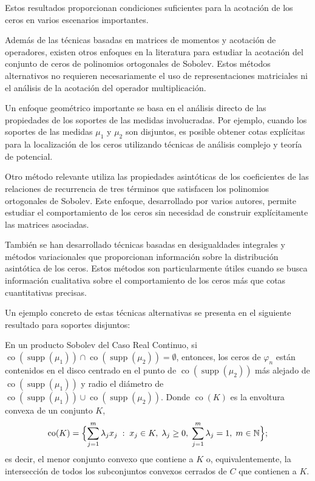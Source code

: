 Estos resultados proporcionan condiciones suficientes para la acotación de los ceros en varios escenarios importantes.

Además de las técnicas basadas en matrices de momentos y acotación de operadores, existen otros enfoques en la literatura para estudiar la acotación del conjunto de ceros de polinomios ortogonales de Sobolev. Estos métodos alternativos no requieren necesariamente el uso de representaciones matriciales ni el análisis de la acotación del operador multiplicación.

Un enfoque geométrico importante se basa en el análisis directo de las propiedades de los soportes de las medidas involucradas. Por ejemplo, cuando los soportes de las medidas $\mu_1$ y $\mu_2$ son disjuntos, es posible obtener cotas explícitas para la localización de los ceros utilizando técnicas de análisis complejo y teoría de potencial.

Otro método relevante utiliza las propiedades asintóticas de los coeficientes de las relaciones de recurrencia de tres términos que satisfacen los polinomios ortogonales de Sobolev. Este enfoque, desarrollado por varios autores, permite estudiar el comportamiento de los ceros sin necesidad de construir explícitamente las matrices asociadas.

También se han desarrollado técnicas basadas en desigualdades integrales y métodos variacionales que proporcionan información sobre la distribución asintótica de los ceros. Estos métodos son particularmente útiles cuando se busca información cualitativa sobre el comportamiento de los ceros más que cotas cuantitativas precisas.

Un ejemplo concreto de estas técnicas alternativas se presenta en el siguiente resultado para soportes disjuntos:

\begin{theorem}\label{thm:disjoint_support}
	\cite{lagomasino2001sobolev} En un producto Sobolev del Caso Real Continuo, si $\operatorname{co}(\operatorname{supp}(\mu_1)) \cap \operatorname{co}(\operatorname{supp}(\mu_2)) = \emptyset$, entonces, los ceros de $\varphi_n$ están contenidos en el disco centrado en el punto de $\operatorname{co}(\operatorname{supp}(\mu_2))$ más alejado de $\operatorname{co}(\operatorname{supp}(\mu_1))$ y
	radio el diámetro de $\operatorname{co}(\operatorname{supp}(\mu_1)) \cup \operatorname{co}(\operatorname{supp}(\mu_2))$. Donde $\operatorname{co}(K)$ es la envoltura convexa de un conjunto \(K\),
	\[
		\operatorname{co}(K)=\Bigl\{\sum_{j=1}^m \lambda_j x_j \;:\;
		x_j\in K,\;
		\lambda_j\ge 0,\;
		\sum_{j=1}^m \lambda_j =1,\;
		m\in \mathbb{N}\Bigr\};
	\]
	es decir, el menor conjunto convexo que contiene a \(K\) o, equivalentemente, la intersección de todos los subconjuntos convexos cerrados de \(C\) que contienen a \(K\).
\end{theorem}